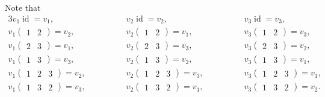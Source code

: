 \documentclass[a4paper, 12pt]{article}
\DeclareMathOperator{\id}{id}
\begin{document}
Note that
\begin{alignat*}{3}
    v_1 \id = v_1, & \hspace{4em} v_2 \id = v_2, & \hspace{4em} v_3 \id = v_3, \\
    v_1 \begin{pmatrix} 1 & 2 \end{pmatrix} = v_2, & \hspace{4em} v_2 \begin{pmatrix} 1 & 2 \end{pmatrix} = v_1, & \hspace{4em} v_3 \begin{pmatrix} 1 & 2 \end{pmatrix} = v_3, \\
    v_1 \begin{pmatrix} 2 & 3 \end{pmatrix} = v_1, & \hspace{4em} v_2 \begin{pmatrix} 2 & 3 \end{pmatrix} = v_3, & \hspace{4em} v_3 \begin{pmatrix} 2 & 3 \end{pmatrix} = v_2, \\
    v_1 \begin{pmatrix} 1 & 3 \end{pmatrix} = v_3, & \hspace{4em} v_2 \begin{pmatrix} 1 & 3 \end{pmatrix} = v_2, & \hspace{4em} v_3 \begin{pmatrix} 1 & 3 \end{pmatrix} = v_1, \\
    v_1 \begin{pmatrix} 1 & 2 & 3 \end{pmatrix} = v_2, & \hspace{4em} v_2 \begin{pmatrix} 1 & 2 & 3 \end{pmatrix} = v_3, & \hspace{4em} v_3 \begin{pmatrix} 1 & 2 & 3 \end{pmatrix} = v_1, \\
    v_1 \begin{pmatrix} 1 & 3 & 2 \end{pmatrix} = v_3, & \hspace{4em} v_2 \begin{pmatrix} 1 & 3 & 2 \end{pmatrix} = v_1, & \hspace{4em} v_3 \begin{pmatrix} 1 & 3 & 2 \end{pmatrix} = v_2.
\end{alignat*}
\end{document}
